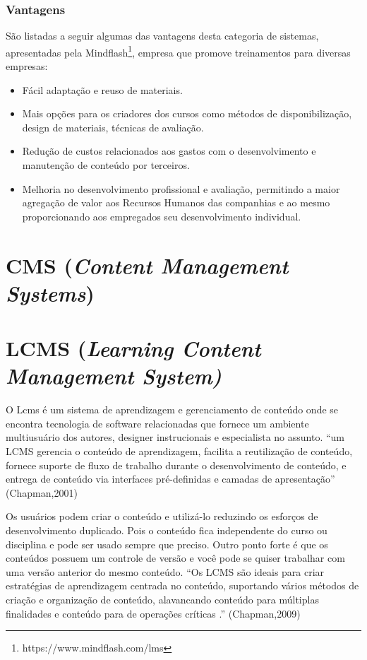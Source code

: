 \documentclass[12pt]{article}
\begin{document}
\subsubsection{Vantagens}

São listadas a seguir algumas das vantagens desta categoria de sistemas, apresentadas pela Mindflash\footnote{https://www.mindflash.com/lms}, 
empresa que promove treinamentos para diversas empresas:

\begin{itemize}
 \item Fácil adaptação e reuso de materiais.
 \item Mais opções para os criadores dos cursos como métodos de disponibilização, design de materiais, técnicas de avaliação.
 \item Redução de custos relacionados aos gastos com o desenvolvimento e manutenção de conteúdo por terceiros.
 \item Melhoria no desenvolvimento profissional e avaliação, permitindo a maior agregação de valor aos Recursos Humanos das companhias e ao mesmo 
 proporcionando aos empregados seu desenvolvimento individual.
\end{itemize}

\section{CMS (\textit{Content Management Systems})}

\section{LCMS (\textit{Learning Content Management System)}}

O Lcms é um sistema de aprendizagem e gerenciamento de conteúdo onde se encontra tecnologia de software relacionadas que fornece um ambiente multiusuário dos autores, designer instrucionais e especialista no assunto. “um LCMS gerencia o conteúdo de aprendizagem, facilita a reutilização de conteúdo, fornece suporte de fluxo de trabalho durante o desenvolvimento de conteúdo, e
entrega de conteúdo via interfaces pré-definidas e camadas de apresentação” (Chapman,2001)



Os usuários podem criar o conteúdo e utilizá-lo reduzindo os esforços de desenvolvimento duplicado. Pois o conteúdo fica independente do curso ou disciplina e pode ser usado sempre que preciso. Outro ponto forte é que os conteúdos possuem um controle de versão e você pode se quiser trabalhar com uma versão anterior do mesmo conteúdo. “Os LCMS são ideais para criar estratégias de aprendizagem centrada no conteúdo, suportando vários métodos de criação e organização de conteúdo, alavancando conteúdo para múltiplas finalidades e conteúdo para de operações críticas .” (Chapman,2009)
\end{document}
